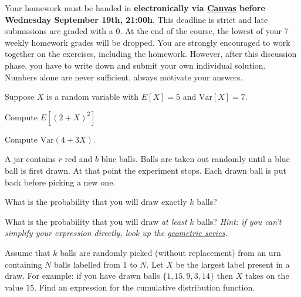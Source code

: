 \documentclass[a4paper,10pt,landscape,twocolumn]{scrartcl}
\newcommand\deadline{Wednesday September 19th, 21:00h}
\begin{document}
\homeworkproblems

{\sffamily\noindent
  Your homework must be handed in \textbf{electronically via
  \href{\canvasURL}{Canvas} before \deadline}. This deadline is strict and late
  submissions are graded with a 0. At the end of the course, the lowest of your
  7 weekly homework grades will be dropped. You are strongly encouraged to work
  together on the exercises, including the homework. However, after this
  discussion phase, you have to write down and submit your own individual
  solution. Numbers alone are never sufficient, always motivate your answers.
}


\begin{exercise}
  Suppose $X$ is a random variable with $E[X] = 5$ and $\mathrm{Var}[X] = 7$.	
  
  \begin{subex}[0.5pt]
    Compute $E[(2+X)^2]$
  \end{subex}	
  
  \begin{subex}[0.5pt]
    Compute $\mathrm{Var}(4+3X)$.
  \end{subex}
\end{exercise}



\begin{exercise}
  A jar contains $r$ red and $b$ blue balls. Balls are taken out randomly until
  a blue ball is first drawn. At that point the experiment stops. Each drawn
  ball is put back before picking a new one.
  
  \begin{subex}[1pt]
    What is the probability that you will draw exactly $k$ balls? 
  \end{subex}
  
  \begin{subex}[1.5pt]
    What is the probability that you will draw \emph{at least} $k$ balls? 
    \emph{Hint: if you can't simplify your expression directly, look up the
    \href{https://en.wikipedia.org/wiki/Geometric_series}{geometric series}.}
  \end{subex}
\end{exercise}


\begin{exercise}
  Assume that $k$ balls are randomly picked (without replacement) from an urn
  containing $N$ balls labelled from $1$ to $N$. Let $X$ be the largest label
  present in a draw. For example: if you have drawn balls $\{1, 15, 9, 3, 14\}$
  then $X$ takes on the value $15$. Find an expression for the cumulative
  distribution function.
\end{exercise}
\end{document}
